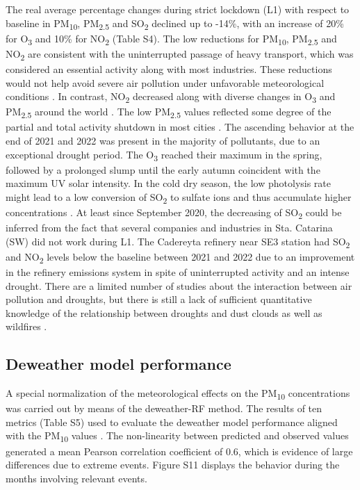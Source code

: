 \documentclass[preprint,12pt]{elsarticle}
\begin{document}
The real average percentage changes during strict lockdown (L1) with respect to baseline in PM\textsubscript{10}, PM\textsubscript{2.5} and SO\textsubscript{2} declined up to -14\%, with an increase of 20\% for O\textsubscript{3} and 10\% for NO\textsubscript{2} (Table S4). The low reductions for PM\textsubscript{10}, PM\textsubscript{2.5} and NO\textsubscript{2} are consistent with the uninterrupted passage of heavy transport, which was considered an essential activity along with most industries. These reductions would not help avoid severe air pollution under unfavorable meteorological conditions \citep{Wang_2020}. In contrast, NO\textsubscript{2} decreased along with diverse changes in O\textsubscript{3} and PM\textsubscript{2.5} around the world \citep{Sokhi2021}. The low PM\textsubscript{2.5} values reflected some degree of the partial and total activity shutdown in most cities \citep{Chauhan_2020,Saha_2022}. The ascending behavior at the end of 2021 and 2022 was present in the majority of pollutants, due to an exceptional drought period. The O\textsubscript{3} reached their maximum in the spring, followed by a prolonged slump until the early autumn coincident with the maximum UV solar intensity. In the cold dry season, the low photolysis rate might lead to a low conversion of SO\textsubscript{2} to sulfate ions and thus accumulate higher concentrations \citep{Gonz_lez_2018}. At least since September 2020, the decreasing of SO\textsubscript{2} could be inferred from the fact that several companies and industries in Sta. Catarina (SW) did not work during L1. The Cadereyta refinery near SE3 station had SO\textsubscript{2} and NO\textsubscript{2} levels below the baseline between 2021 and 2022 due to an improvement in the refinery emissions system in spite of uninterrupted activity and an intense drought. There are a limited number of studies about the interaction between air pollution and droughts, but there is still a lack of sufficient quantitative knowledge of the relationship between droughts and dust clouds as well as wildfires \citep{He_2024}.
\subsection{Deweather model performance}
A special normalization of the meteorological effects on the PM\textsubscript{10} concentrations was carried out by means of the deweather-RF method. The results of ten metrics (Table S5) used to evaluate the deweather model performance aligned with the PM\textsubscript{10} values \citep{Lv_2022}. The non-linearity between predicted and observed values generated a mean Pearson correlation coefficient of 0.6, which is evidence of large differences due to extreme events. Figure S11 displays the behavior during the months involving relevant events.
\end{document}

